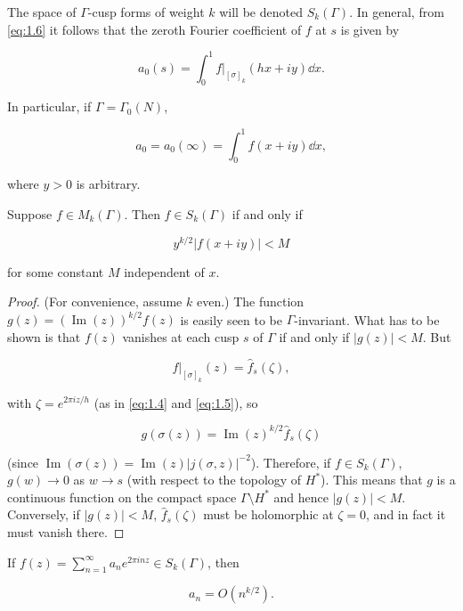 The space of $\Gamma$-cusp forms of weight $k$ will be denoted $S_k(\Gamma)$. In general, from \eqref{eq:1.6} it follows that the zeroth Fourier coefficient of $f$ at $s$ is given by

\begin{equation}\label{eq:1.8}
a_0(s) = \int_0^1 f\big|_{[\sigma]_k}(hx + iy) \dd x.\tag{1.8}
\end{equation}

In particular, if $\Gamma = \Gamma_0(N)$,

\[
a_0 = a_0(\infty) = \int_0^1 f(x + iy) \dd x,
\]

where $y > 0$ is arbitrary.

\begin{lemma}\label{lem:1.5}

Suppose $f \in M_k(\Gamma)$. Then $f \in S_k(\Gamma)$ if and only if

\begin{equation}\label{eq:1.9}
y^{k/2}|f(x + iy)| < M\tag{1.9}
\end{equation}

for some constant $M$ independent of $x$.

\end{lemma}

\begin{proof}

(For convenience, assume $k$ even.) The function $g(z) = (\operatorname{Im}(z))^{k/2} f(z)$ is easily seen to be $\Gamma$-invariant. What has to be shown is that $f(z)$ vanishes at each cusp $s$ of $\Gamma$ if and only if $|g(z)| < M$. But

\[
f\big|_{[\sigma]_k}(z) = \hat{f}_s(\zeta),
\]

with $\zeta = e^{2\pi iz/h}$ (as in \eqref{eq:1.4} and \eqref{eq:1.5}), so

\[
g(\sigma(z)) = \operatorname{Im}(z)^{k/2} \hat{f}_s(\zeta)
\]

(since $\operatorname{Im}(\sigma(z)) = \operatorname{Im}(z)|j(\sigma, z)|^{-2}$). Therefore, if $f \in S_k(\Gamma)$, $g(w) \to 0$ as $w \to s$ (with respect to the topology of $H^*$). This means that $g$ is a continuous function on the compact space $\Gamma \setminus H^*$ and hence $|g(z)| < M$. Conversely, if $|g(z)| < M$, $\hat{f}_s(\zeta)$ must be holomorphic at $\zeta = 0$, and in fact it must vanish there.

\end{proof}

\begin{corollary}\label{cor:1.6}

If $f(z) = \sum_{n=1}^{\infty} a_n e^{2\pi inz} \in S_k(\Gamma)$, then

\begin{equation}\label{eq:1.10}
a_n = O(n^{k/2}).\tag{1.10}
\end{equation}

\end{corollary}

